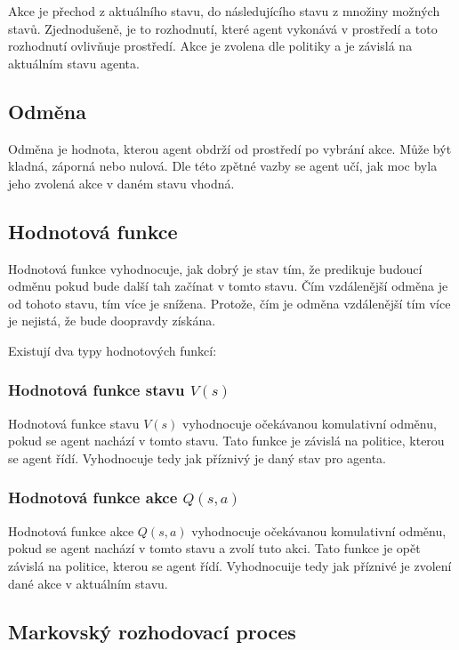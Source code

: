 Akce je přechod z aktuálního stavu, do následujícího stavu z množiny možných stavů.
Zjednodušeně, je to rozhodnutí, které agent vykonává v prostředí a toto rozhodnutí ovlivňuje prostředí.
Akce je zvolena dle politiky a je závislá na aktuálním stavu agenta.
  
\subsection{Odměna}\label{subsec:odmena}

  Odměna je hodnota, kterou agent obdrží od prostředí po vybrání akce.
  Může být kladná, záporná nebo nulová.
  Dle této zpětné vazby se agent učí, jak moc byla jeho zvolená akce v daném stavu vhodná.

\subsection{Hodnotová funkce}\label{subsec:hodnotova-funkce}

  Hodnotová funkce vyhodnocuje, jak dobrý je stav tím, že predikuje budoucí odměnu pokud bude další tah začínat v tomto stavu.
  Čím vzdálenější odměna je od tohoto stavu, tím více je snížena.
  Protože, čím je odměna vzdálenější tím více je nejistá, že bude doopravdy získána.

  Existují dva typy hodnotových funkcí:

  \subsubsection*{Hodnotová funkce stavu $V(s)$}

  Hodnotová funkce stavu \emph{$V(s)$} vyhodnocuje očekávanou komulativní odměnu, pokud se agent nachází v tomto stavu.
  Tato funkce je závislá na politice, kterou se agent řídí.
  Vyhodnocuje tedy jak příznivý je daný stav pro agenta.

  \subsubsection*{Hodnotová funkce akce $Q(s, a)$}
  \label{subsubsec:q_function}

  Hodnotová funkce akce \emph{$Q(s, a)$} vyhodnocuje očekávanou komulativní odměnu, pokud se agent nachází v tomto stavu a zvolí tuto akci.
  Tato funkce je opět závislá na politice, kterou se agent řídí.
  Vyhodnocuije tedy jak příznivé je zvolení dané akce v aktuálním stavu.

\subsection{Markovský rozhodovací proces}\label{subsec:markovsky-rozhodovaci-proces}

